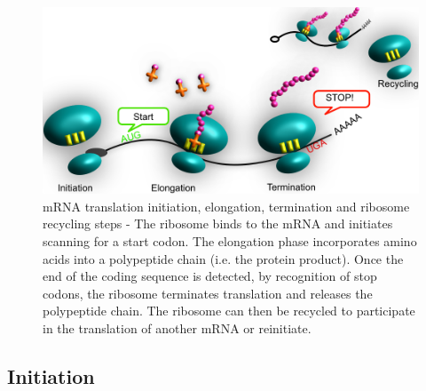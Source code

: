 \documentclass[12pt,openany]{book}
\begin{document}
\begin{figure}
  \includegraphics{./figures/doodleTranslation.pdf}
  \caption{mRNA translation initiation, elongation, termination and ribosome recycling steps - The ribosome binds to the mRNA and initiates scanning for a start codon. The elongation phase incorporates amino acids into a polypeptide chain (i.e. the protein product). Once the end of the coding sequence is detected, by recognition of stop codons, the ribosome terminates translation and releases the polypeptide chain. The ribosome can then be recycled to participate in the translation of another mRNA or reinitiate. \label{fig:doodlemRNASteps}}
\end{figure}

\clearpage

\subsection{Initiation} \label{initiation}
\end{document}
